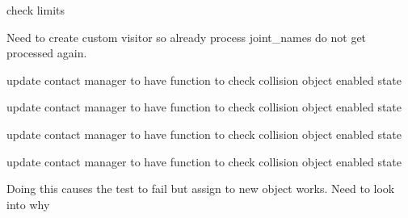 \begin{DoxyRefList}
%
check limits  
\item[Member \mbox{\hyperlink{classtesseract__scene__graph_1_1SceneGraph_a3d78ee8fc4abe4542a4d4f5195a972c5}{tesseract\+\_\+scene\+\_\+graph\+::Scene\+Graph\+::get\+Joint\+Children\+Names}} (const std\+::vector$<$ std\+::string $>$ \&names) const]\label{todo__todo000009}%
%
Need to create custom visitor so already process joint\+\_\+names do not get processed again.  
\item[Member \mbox{\hyperlink{tesseract__environment__unit_8cpp_a0885de2a8da955b4bb9b9be73de49350}{TEST}} (Tesseract\+Environment\+Unit, Env\+Change\+Link\+Collision\+Enabled\+Command\+Unit)]\label{todo__todo000005}%
%
update contact manager to have function to check collision object enabled state  
\item[Member \mbox{\hyperlink{tesseract__environment__unit_8cpp_aa8be7c5729a18846a93f15be668f8d93}{TEST}} (Tesseract\+Environment\+Unit, Env\+Change\+Link\+Visibility\+Command\+Unit)]\label{todo__todo000006}%
%
update contact manager to have function to check collision object enabled state  
\item[Member \mbox{\hyperlink{tesseract__environment__unit_8cpp_a48e8ba4aff90b6492e3905dc3d9a2686}{TEST}} (Tesseract\+Environment\+Unit, Env\+Set\+Active\+Continuous\+Contact\+Manager\+Command\+Unit)]\label{todo__todo000007}%
%
update contact manager to have function to check collision object enabled state  
\item[Member \mbox{\hyperlink{tesseract__environment__unit_8cpp_ac000b39be53683eced961b8e905d5050}{TEST}} (Tesseract\+Environment\+Unit, Env\+Set\+Active\+Discrete\+Contact\+Manager\+Command\+Unit)]\label{todo__todo000008}%
%
update contact manager to have function to check collision object enabled state  
\item[Member \mbox{\hyperlink{tesseract__scene__graph__unit_8cpp_a07e5d7fb0413d0780df4b637bcd35845}{TEST}} (Tesseract\+Scene\+Graph\+Unit, Tesseract\+Scene\+Graph\+Remove\+Link\+Unit)]\label{todo__todo000010}%
%
Doing this causes the test to fail but assign to new object works. Need to look into why 
\end{DoxyRefList}